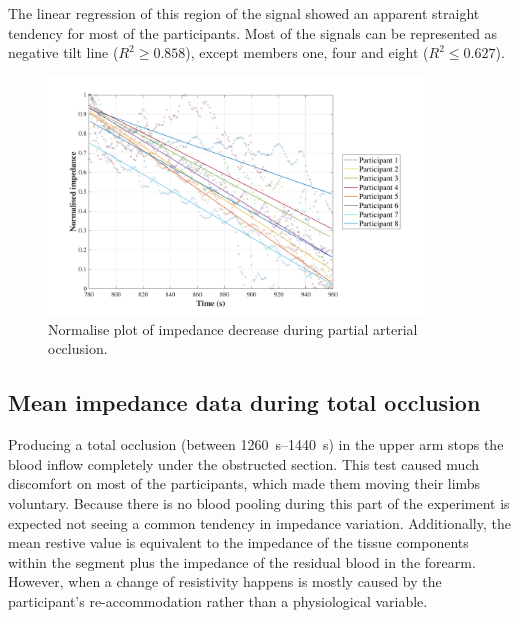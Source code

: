 The linear regression of this region of the signal showed an apparent straight tendency for most of the participants. Most of the signals can be represented as negative tilt line ($R^2 \geq 0.858 $), except members one, four and eight ($R^2 \leq 0.627 $).


\begin{figure}[!htbp]
	\centering
	\includegraphics[width=0.9\textwidth,height=0.9\textheight,keepaspectratio]{figure4}    
	\caption{Normalise plot of impedance decrease during partial arterial occlusion.}
	\label{fig:normalise:arterial_occlusion}
\end{figure}



\subsection{Mean impedance data during total occlusion}
\label{section results 2.4}
Producing a total occlusion (between \SIrange{1260}{1440}{\second}) in the upper arm stops the blood inflow completely under the obstructed section. This test caused much discomfort on most of the participants, which made them moving their limbs voluntary. Because there is no blood pooling during this part of the experiment is expected not seeing a common tendency in impedance variation. Additionally, the mean restive value is equivalent to the impedance of the tissue components within the segment plus the impedance of the residual blood in the forearm. However, when a change of resistivity happens is mostly caused by the participant's re-accommodation rather than a physiological variable. 


